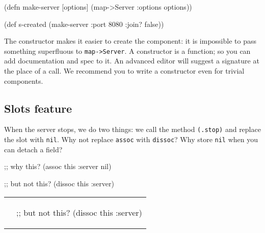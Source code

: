 \else

\begin{english}
  \begin{clojure}
(defn make-server
  [options]
  (map->Server {:options options}))

(def s-created (make-server {:port 8080 :join? false}))
  \end{clojure}
\end{english}

\fi

The constructor makes it easier to create the component: it is impossible to pass something superfluous to \verb|map->Server|. A constructor is a function; so you can add documentation and spec to it. An advanced editor will suggest a signature at the place of a call. We recommend you to write a constructor even for trivial components.

\subsection{Slots feature}

When the server stops, we do two things: we call the method \verb|(.stop)| and replace the slot with \verb|nil|. Why not replace \verb|assoc| with \verb|dissoc|? Why store \verb|nil| when you can detach a field?

\ifnarrow

\begin{english}
  \begin{clojure}
;; why this?
(assoc this :server nil)

;; but not this?
(dissoc this :server)
  \end{clojure}
\end{english}

\else

\begin{english}

\noindent
\iflarge
\begin{tabular}{ @{}p{5.5cm} @{}p{5cm} }
\else
\begin{tabular}{ @{}p{5cm} @{}p{5cm} }
\fi

  \begin{clojure}
;; why this?
(assoc this :server nil)
  \end{clojure}

&

  \begin{clojure}
;; but not this?
(dissoc this :server)
  \end{clojure}

\end{tabular}

\end{english}


